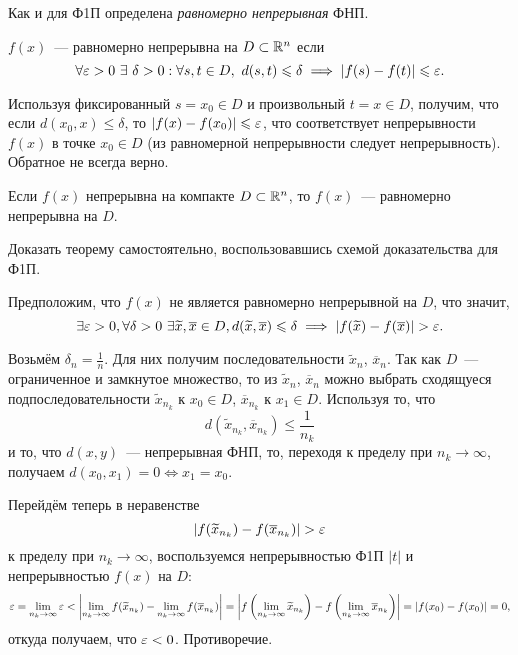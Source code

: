 \documentclass[../../main.tex]{subfiles}
\begin{document}
	Как и для Ф1П определена \emph{равномерно непрерывная} ФНП.
	\begin{defn}
		$f(x)$~--- равномерно непрерывна на $D \subset \mathbb{R}^n$ если 
		\[
			\forall \eps > 0 \ \exists \ \delta > 0 : \forall s, t \in D,\ 
			d(s, t) \leq \delta \implies |f(s) - f(t)| \leq \eps.
		\]
	\end{defn}
	
	Используя фиксированный $s = x_0 \in D$ и произвольный $t = x \in D$, 
	получим, что если $d(x_0, x) \leq \delta$, то $|f(x) - f(x_0)| \leqslant \varepsilon$,
	что соответствует непрерывности $f(x)$ в точке $x_0 \in D$ (из равномерной 
	непрерывности следует непрерывность). Обратное не всегда верно.
	
	\begin{thm}[Кантор]
		Если $f(x)$ непрерывна на компакте $D \subset \mathbb{R}^n$, то $f(x)$~---
		равномерно непрерывна на $D$.
	\end{thm} 
	
	\begin{exc}
		Доказать теорему самостоятельно, воспользовавшись 
		схемой доказательства для Ф1П.
	\end{exc}
	\begin{eans}
		Предположим, что $f(x)$ не является равномерно непрерывной на $D$, что 
		значит,
		\[\exists \varepsilon > 0, \forall \delta > 0\ \exists \widetilde{x}, 
		\overline{x}\in D, d(\widetilde{x}, \overline{x})\leqslant \delta \implies 
		\left|{f(\widetilde{x}) - f(\overline{x})}\right| > \varepsilon.\]
		
		Возьмём $\delta_n = \frac{1}{n}$. Для них получим последовательности 
		$\widetilde{x}_n$, $\overline{x}_n$. Так как $D$~--- ограниченное и 
		замкнутое множество, то из $\widetilde{x}_n$, $\overline{x}_n$ можно выбрать 
		сходящуеся подпоследовательности $\widetilde{x}_{n_k}$ к $x_0\in D$, 
		$\overline{x}_{n_k}$ к $x_1\in D$. Используя то, что
		\[d(\widetilde{x}_{n_k}, \overline{x}_{n_k})\leq\frac{1}{n_k}\]
		и то, что $d(x, y)$~--- непрерывная ФНП, то, переходя к пределу при 
		$n_k\to\infty$, получаем $d(x_0, x_1) = 0 \iff x_1 = x_0$.
		
		Перейдём теперь в неравенстве
		\[\left|{f(\widetilde{x}_{n_k}) - f(\overline{x}_{n_k})}\right| > \varepsilon\]
		к пределу при $n_k\to\infty$, воспользуемся непрерывностью Ф1П $|t|$ и 
		непрерывностью $f(x)$ на $D$:
		\[\varepsilon = \lim_{n_k\to\infty}\varepsilon < 
		\left|{\lim_{n_k\to\infty}f(\widetilde{x}_{n_k}) - 
		\lim_{n_k\to\infty}f(\overline{x}_{n_k})}\right| = 
		\left|{f\left(\lim_{n_k\to\infty}\widetilde{x}_{n_k}\right) - 
		f\left(\lim_{n_k\to\infty}\overline{x}_{n_k}\right)}\right| = \left|{f(x_0) - f(x_0)}\right| 
		= 0,\]
		откуда получаем, что $\varepsilon < 0$. Противоречие.
	\end{eans}
\end{document}
